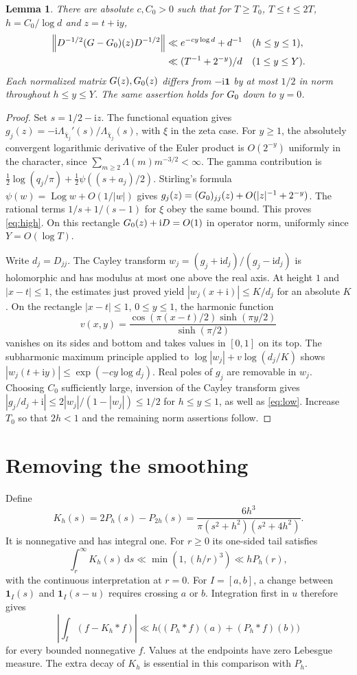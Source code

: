 \documentclass[11pt]{article}
\newtheorem{lemma}[theorem]{Lemma}
\DeclareMathOperator{\Log}{Log}\DeclareMathOperator{\tr}{tr}\DeclareMathOperator{\diag}{diag}
\newcommand{\dd}{\,\mathrm d}\newcommand{\ii}{\mathrm i}
\newcommand{\id}{\mathbf1}\newcommand{\norm}[1]{\left\lVert#1\right\rVert}
\begin{document}
\begin{lemma}\label{lem:strip}
There are absolute $c,C_0>0$ such that for $T\ge T_0$, $T\le t\le2T$, $h=C_0/\log d$ and $z=t+\ii y$,
\begin{align}
 \norm{D^{-1/2}(G-\Gm)(z)D^{-1/2}}
 &\ll e^{-c y\log d}+d^{-1} && (h\le y\le1),\label{eq:low}\\
 &\ll (T^{-1}+2^{-y})/d && (1\le y\le Y).\label{eq:high}
\end{align}
Each normalized matrix $G(z),G_0(z)$ differs from $-\ii\id$ by at most $1/2$ in norm throughout $h\le y\le Y$. The same assertion holds for $G_0$ down to $y=0$.
\end{lemma}
\begin{proof}
Set $s=1/2-\ii z$. The functional equation gives $g_j(z)=-\ii\Lambda_{\bar\chi_j}'(s)/\Lambda_{\bar\chi_j}(s)$, with $\xi$ in the zeta case. For $y\ge1$, the absolutely convergent logarithmic derivative of the Euler product is $O(2^{-y})$ uniformly in the character, since $\sum_{m\ge2}\Lambda(m)m^{-3/2}<\infty$. The gamma contribution is $\tfrac12\log(q_j/\pi)+\tfrac12\psi((s+a_j)/2)$. Stirling's formula $\psi(w)=\Log w+O(1/|w|)$ gives $g_j(z)=(G_0)_{jj}(z)+O(|z|^{-1}+2^{-y})$. The rational terms $1/s+1/(s-1)$ for $\xi$ obey the same bound. This proves \eqref{eq:high}. On this rectangle $\Gm(z)+\ii D=O(1)$ in operator norm, uniformly since $Y=O(\log T)$.

Write $d_j=D_{jj}$. The Cayley transform $w_j=(g_j+\ii d_j)/(g_j-\ii d_j)$ is holomorphic and has modulus at most one above the real axis. At height $1$ and $|x-t|\le1$, the estimates just proved yield $|w_j(x+\ii)|\le K/d_j$ for an absolute $K$. On the rectangle $|x-t|\le1$, $0\le y\le1$, the harmonic function
\[
 v(x,y)=\frac{\cos(\pi(x-t)/2)\sinh(\pi y/2)}{\sinh(\pi/2)}
\]
vanishes on its sides and bottom and takes values in $[0,1]$ on its top. The subharmonic maximum principle applied to $\log|w_j|+v\log(d_j/K)$ shows
$|w_j(t+\ii y)|\le\exp(-c y\log d_j)$. Real poles of $g_j$ are removable in $w_j$. Choosing $C_0$ sufficiently large, inversion of the Cayley transform gives
$|g_j/d_j+\ii|\le 2|w_j|/(1-|w_j|)\le1/2$ for $h\le y\le1$, as well as \eqref{eq:low}. Increase $T_0$ so that $2h<1$ and the remaining norm assertions follow.
\end{proof}

\section{Removing the smoothing}
Define
\[
 K_h(s)=2P_h(s)-P_{2h}(s)=\frac{6h^3}{\pi(s^2+h^2)(s^2+4h^2)}.
\]
It is nonnegative and has integral one. For $r\ge0$ its one-sided tail satisfies
\[
 \int_r^\infty K_h(s)\dd s\ll\min(1,(h/r)^3)\ll hP_h(r),
\]
with the continuous interpretation at $r=0$. For $I=[a,b]$, a change between $\id_I(s)$ and $\id_I(s-u)$ requires crossing $a$ or $b$. Integration first in $u$ therefore gives
\begin{equation}\label{eq:clip}
 \left|\int_I(f-K_h*f)\right|
 \ll h\big((P_h*f)(a)+(P_h*f)(b)\big)
\end{equation}
for every bounded nonnegative $f$. Values at the endpoints have zero Lebesgue measure. The extra decay of $K_h$ is essential in this comparison with $P_h$.
\end{document}
